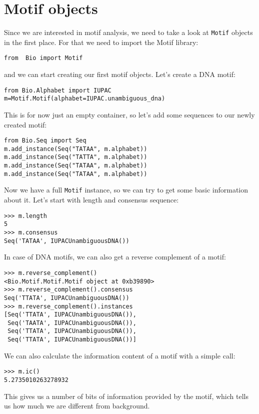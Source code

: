 \documentclass{article}
\begin{document}
\section{Motif objects}
\label{sec:object}
Since we are interested in motif analysis, we need to take a look at
\verb|Motif| objects in the first place. For that we need to import 
the Motif library:
\begin{verbatim}
from  Bio import Motif
\end{verbatim}
and we can start creating our first motif objects. Let's create a DNA motif:
\begin{verbatim}
from Bio.Alphabet import IUPAC
m=Motif.Motif(alphabet=IUPAC.unambiguous_dna)
\end{verbatim}
This is for now just an empty container, so let's add some sequences to our newly created motif:
\begin{verbatim}
from Bio.Seq import Seq
m.add_instance(Seq("TATAA", m.alphabet))
m.add_instance(Seq("TATTA", m.alphabet))
m.add_instance(Seq("TATAA", m.alphabet))
m.add_instance(Seq("TATAA", m.alphabet))
\end{verbatim}
Now we have a full \verb|Motif| instance, so we can try to get some
basic information about it. Let's start with length and consensus
sequence:
\begin{verbatim}
>>> m.length
5
>>> m.consensus
Seq('TATAA', IUPACUnambiguousDNA())
\end{verbatim}
In case of DNA motifs, we can also get a reverse complement of a motif:
\begin{verbatim}
>>> m.reverse_complement()
<Bio.Motif.Motif.Motif object at 0xb39890>
>>> m.reverse_complement().consensus
Seq('TTATA', IUPACUnambiguousDNA())
>>> m.reverse_complement().instances  
[Seq('TTATA', IUPACUnambiguousDNA()), 
 Seq('TAATA', IUPACUnambiguousDNA()), 
 Seq('TTATA', IUPACUnambiguousDNA()), 
 Seq('TTATA', IUPACUnambiguousDNA())]
\end{verbatim}

We can also calculate the information content of a motif with a simple call:
\begin{verbatim}
>>> m.ic()
5.2735010263278932
\end{verbatim}
This gives us a number of bits of information provided by the motif,
which tells us how much we are different from background.
\end{document}
